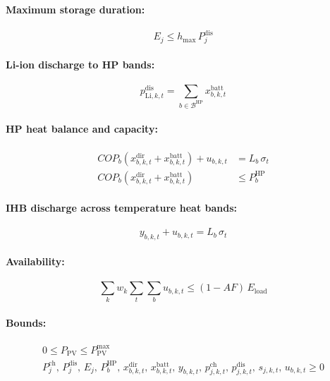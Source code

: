 \documentclass[11pt]{article}
\newcommand{\Li}{\mathrm{Li}}
\newcommand{\HP}{\mathrm{HP}}
\newcommand{\PV}{\mathrm{PV}}
\newcommand{\ch}{\mathrm{ch}}
\newcommand{\dis}{\mathrm{dis}}
\newcommand{\Eload}{E_{\mathrm{load}}}
\begin{document}
\paragraph{Maximum storage duration:}
\begin{equation}
E_{j} \leq h_{\max}\, P_{j}^{\dis}
\label{eq:duration}
\end{equation}

\paragraph{Li-ion discharge to HP bands:}
\begin{equation}
p_{\Li,k,t}^{\dis} = \sum_{b \in \mathcal{B}^{\HP}} x_{b,k,t}^{\mathrm{batt}}
\label{eq:li-dis}
\end{equation}

\paragraph{HP heat balance and capacity:}
\begin{align}
COP_{b}\left( x_{b,k,t}^{\mathrm{dir}} + x_{b,k,t}^{\mathrm{batt}} \right) + u_{b,k,t} &= L_{b}\,\sigma_{t} \label{eq:hp-balance}\\
COP_{b}\left( x_{b,k,t}^{\mathrm{dir}} + x_{b,k,t}^{\mathrm{batt}} \right) &\leq P_{b}^{\HP} \label{eq:hp-cap}
\end{align}

\paragraph{IHB discharge across temperature heat bands:}
\begin{equation}
y_{b,k,t} + u_{b,k,t} = L_{b}\,\sigma_{t}
\label{eq:ihb-balance}
\end{equation}

\paragraph{Availability:}
\begin{equation}
\sum_{k} w_{k}\sum_{t}\sum_{b} u_{b,k,t} \leq (1 - AF)\,\Eload
\label{eq:availability}
\end{equation}

\paragraph{Bounds:}
\begin{gather}
0 \leq P_{\PV} \leq P_{\PV}^{\max} \label{eq:pv-bound}\\
P_{j}^{\ch},\, P_{j}^{\dis},\, E_{j},\, P_{b}^{\HP},\, x_{b,k,t}^{\mathrm{dir}},\, x_{b,k,t}^{\mathrm{batt}},\, y_{b,k,t},\, p_{j,k,t}^{\ch},\, p_{j,k,t}^{\dis},\, s_{j,k,t},\, u_{b,k,t} \geq 0 \label{eq:nonneg}
\end{gather}
\end{document}
